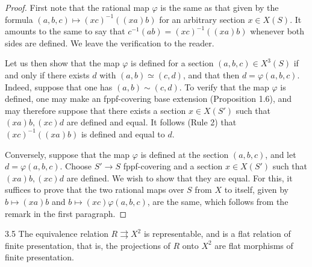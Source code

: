 \begin{proof}
First note that the
rational map \(\varphi\)
is the same as that given
by the formula
\((a,b,c)\mapsto(xc)^{-1}((xa)b)\)
for an arbitrary section
\(x\in X(S)\).
It amounts to the same
to say that
\(c^{-1}(ab)=(xc)^{-1}((xa)b)\)
whenever both sides are defined.
We leave the verification
to the reader.

Let us then show that
the map \(\varphi\) is
defined for a section
\((a,b,c)\in X^3(S)\)
if and only if there
exists \(d\) with
\((a,b)\simeq(c,d)\),
and that then
\(d=\varphi(a,b,c)\).
Indeed, suppose that
one has \((a,b)\sim(c,d)\).
To verify that the map
\(\varphi\) is defined,
one may make an fppf-covering
base extension (Proposition 1.6),
and may therefore suppose
that there exists a
section \(x\in X(S')\)
such that \((xa)b,(xc)d\)
are defined and equal.
It follows (Rule 2) that
\((xc)^{-1}((xa)b)\)
is defined and equal to \(d\).

Conversely, suppose that
the map \(\varphi\) is
defined at the section
\((a,b,c)\), and let
\(d=\varphi(a,b,c)\).
Choose \(S'\to S\)
fppf-covering and a
section \(x\in X(S')\)
such that \((xa)b,(xc)d\)
are defined.
We wish to show that
they are equal.
For this, it suffices
to prove that the
two rational maps over
\(S\) from \(X\) to
itself, given by
\(b\mapsto(xa)b\)
and \(b\mapsto(xc)\varphi(a,b,c)\),
are the same, which
follows from the remark
in the first paragraph.
\end{proof}
\begin{proposition}{3.5}\label{XVIII.3.5}
The equivalence relation
\(R\rightrightarrows X^2\)
is representable, and
is a flat relation of
finite presentation, that
is, the projections
of \(R\) onto \(X^2\)
are flat morphisms of
finite presentation.
\end{proposition}
